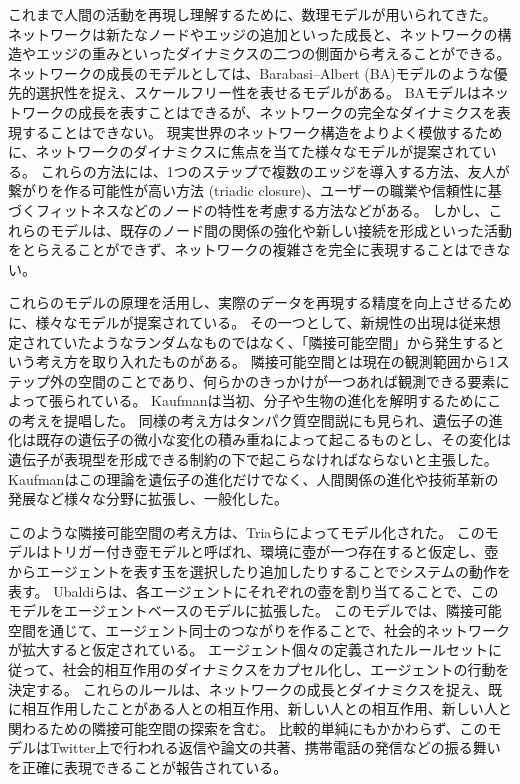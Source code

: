 \documentclass[uplatex,11pt,openany]{ujreport}
\begin{document}
    これまで人間の活動を再現し理解するために、数理モデルが用いられてきた。
    ネットワークは新たなノードやエッジの追加といった成長と、ネットワークの構造やエッジの重みといったダイナミクスの二つの側面から考えることができる。
    ネットワークの成長のモデルとしては、Barabasi--Albert (BA)モデルのような優先的選択性を捉え、スケールフリー性を表せるモデルがある\cite{barabasiEmergenceScalingRandom1999, barabasiOriginBurstsHeavy2005,barabasiScaleFreeNetworksDecade2009}。
    BAモデルはネットワークの成長を表すことはできるが、ネットワークの完全なダイナミクスを表現することはできない。
    現実世界のネットワーク構造をよりよく模倣するために、ネットワークのダイナミクスに焦点を当てた様々なモデルが提案されている。
    これらの方法には、1つのステップで複数のエッジを導入する方法\cite{albertTopologyEvolvingNetworks2000}、友人が繋がりを作る可能性が高い方法 (triadic closure\cite{bianconiTriadicClosureBasic2014})、ユーザーの職業や信頼性に基づくフィットネスなどのノードの特性を考慮する方法\cite{topirceanuWeightedBetweennessPreferential2018}などがある。
    しかし、これらのモデルは、既存のノード間の関係の強化や新しい接続を形成といった活動をとらえることができず、ネットワークの複雑さを完全に表現することはできない。

    これらのモデルの原理を活用し、実際のデータを再現する精度を向上させるために、様々なモデルが提案されている。
    その一つとして、新規性の出現は従来想定されていたようなランダムなものではなく、「隣接可能空間」から発生するという考え方を取り入れたものがある\cite{monechiWavesNoveltiesExpansion2017,sudaExplorationExploitationAdjacent2022, ubaldiEmergenceEvolutionSocial2021}。
    隣接可能空間とは現在の観測範囲から1ステップ外の空間のことであり、何らかのきっかけが一つあれば観測できる要素によって張られている。
    Kaufmanは当初、分子や生物の進化を解明するためにこの考えを提唱した\cite{kauffmanOriginsOrderSelforganization1993}。
    同様の考え方はタンパク質空間説にも見られ、遺伝子の進化は既存の遺伝子の微小な変化の積み重ねによって起こるものとし、その変化は遺伝子が表現型を形成できる制約の下で起こらなければならないと主張した\cite{maynardsmithNaturalSelectionConcept1970}。
    Kaufmanはこの理論を遺伝子の進化だけでなく、人間関係の進化や技術革新の発展など様々な分野に拡張し、一般化した。

    このような隣接可能空間の考え方は、Triaら\cite{triaDynamicsCorrelatedNovelties2014}によってモデル化された。
    このモデルはトリガー付き壺モデルと呼ばれ、環境に壺が一つ存在すると仮定し、壺からエージェントを表す玉を選択したり追加したりすることでシステムの動作を表す。
    Ubaldiらは、各エージェントにそれぞれの壺を割り当てることで、このモデルをエージェントベースのモデルに拡張した\cite{ubaldiEmergenceEvolutionSocial2021}。
    このモデルでは、隣接可能空間を通じて、エージェント同士のつながりを作ることで、社会的ネットワークが拡大すると仮定されている。
    エージェント個々の定義されたルールセットに従って、社会的相互作用のダイナミクスをカプセル化し、エージェントの行動を決定する。
    これらのルールは、ネットワークの成長とダイナミクスを捉え、既に相互作用したことがある人との相互作用、新しい人との相互作用、新しい人と関わるための隣接可能空間の探索を含む。
    比較的単純にもかかわらず、このモデルはTwitter上で行われる返信や論文の共著、携帯電話の発信などの振る舞いを正確に表現できることが報告されている\cite{ubaldiEmergenceEvolutionSocial2021}。
\end{document}
